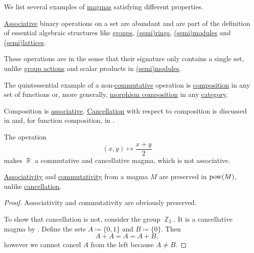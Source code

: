 \begin{example}\label{ex:def:magma}
  We list several examples of \hyperref[def:magma]{magmas} satisfying different properties.

  \begin{thmenum}
     \hyperref[eq:def:magma/associative]{Associative} binary operations on a set are abundant and are part of the definition of essential algebraic structures like \hyperref[def:group]{groups}, \hyperref[def:semiring]{(semi)rings}, \hyperref[def:semimodule]{(semi)modules} and \hyperref[def:semilattice]{(semi)lattices}.

    These operations are  in the sense that their signature only contains a single set, unlike \hyperref[def:group_action]{group actions} and scalar products in \hyperref[def:semimodule]{(semi)modules}.

     The quintessential example of a non-\hyperref[def:magma/commutative]{commutative} operation is \hyperref[def:multi_valued_function/composition]{composition} in any set of functions or, more generally, \hyperref[def:category/composition]{morphism composition} in any \hyperref[def:category]{category}.

    Composition is \hyperref[def:magma/associative]{associative}. \hyperref[def:magma/cancellative]{Cancellation} with respect to composition is discussed in  and, for function composition, in .

     The operation
    \begin{equation*}
      (x, y) \mapsto \dfrac {x + y} 2
    \end{equation*}
    makes \( \BbbR \) a commutative and cancellative magma, which is not associative.
  \end{thmenum}
\end{example}

\begin{proposition}\label{thm:power_set_magma_preservation}
  \hyperref[def:magma/associative]{Associativity} and \hyperref[def:magma/commutative]{commutativity} from a magma \( M \) are preserved in \( \operatorname{pow}(M) \), unlike \hyperref[def:magma/cancellative]{cancellation}.
\end{proposition}
\begin{proof}
  Associativity and commutativity are obviously preserved.

  To show that cancellation is not, consider the group \hyperref[thm:group_of_integers_modulo]{\( \BbbZ_2 \)}. It is a cancellative magma by . Define the sets \( A \coloneqq \{ 0, 1 \} \) and \( B \coloneqq \{ 0 \} \). Then
  \begin{equation*}
    A + A = A = A + B,
  \end{equation*}
  however we cannot cancel \( A \) from the left because \( A \neq B \).
\end{proof}

